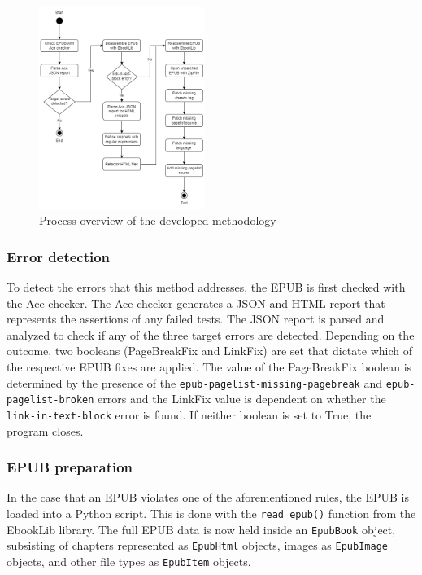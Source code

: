 \begin{figure}[h!]
\includegraphics[width=0.48\textwidth,keepaspectratio]{media/images/Flowchart_Methodology_V2.png}
\caption{Process overview of the developed methodology}
\centering
\label{figure:flowchart}
\end{figure}


\subsubsection{Error detection}
To detect the errors that this method addresses, the EPUB is first checked with the Ace checker. The Ace checker generates a JSON and HTML report that represents the assertions of any failed tests. The JSON report is parsed and analyzed to check if any of the three target errors are detected. Depending on the outcome, two booleans (PageBreakFix and LinkFix) are set that dictate which of the respective EPUB fixes are applied. The value of the PageBreakFix boolean is determined by the presence of the \texttt{epub-pagelist-missing-pagebreak} and \texttt{epub-pagelist-broken} errors and the LinkFix value is dependent on whether the \texttt{link-in-text-block} error is found. If neither boolean is set to True, the program closes.


\subsubsection{EPUB preparation}
In the case that an EPUB violates one of the aforementioned rules, the EPUB is loaded into a Python script. This is done with the \texttt{read\_epub()} function from the EbookLib library. The full EPUB data is now held inside an \texttt{EpubBook} object, subsisting of chapters represented as \texttt{EpubHtml} objects, images as \texttt{EpubImage} objects, and other file types as \texttt{EpubItem} objects.


